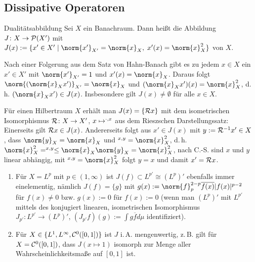 \subsection{%
    Dissipative Operatoren%
}

\begin{Def}{Dualitätsabbildung}
    Sei $X$ ein Banachraum.
    Dann heißt die Abbildung $J\colon X \to \P(X')$ mit
    $J(x) := \{x' \in X' \;|\; \norm{x'}_{X'} = \norm{x}_X,\; x'(x) = \norm{x}_X^2\}$
     von $X$.
\end{Def}

\linie

\begin{Bem}
    Nach einer Folgerung aus dem Satz von Hahn-Banach gibt es zu jedem $x \in X$
    ein $x' \in X'$ mit $\norm{x'}_{X'} = 1$ und
    $x'(x) = \norm{x}_X$.
    Daraus folgt $\norm{(\norm{x}_X x')}_{X'} = \norm{x}_X$ und
    $(\norm{x}_X x')(x) = \norm{x}_X^2$, d.\,h. $(\norm{x}_X x') \in J(x)$.
    Insbesondere gilt $J(x) \not= \emptyset$ für alle $x \in X$.
\end{Bem}

\begin{Bem}
    Für einen Hilbertraum $X$ erhält man $J(x) = \{\R x\}$ mit dem isometrischen Isomorphismus
    $\R\colon X \to X'$, $x \mapsto \sp{\cdot, x}$ aus dem Rieszschen Darstellungssatz:
    Einerseits gilt $\R x \in J(x)$.
    Andererseits folgt aus $x' \in J(x)$ mit $y := \R^{-1} x' \in X$,
    dass $\norm{y}_X = \norm{x}_X$ und $\sp{x, y} = \norm{x}_X^2$,
    d.\,h. $\norm{x}_X^2 = \sp{x, y} \le \norm{x}_X \norm{y}_X = \norm{x}_X^2$,
    nach C.-S. sind $x$ und $y$ linear abhängig, mit $\sp{x, y} = \norm{x}_X^2$ folgt $y = x$
    und damit $x' = \R x$.
\end{Bem}

\begin{Bsp}
    \begin{enumerate}
        \item
        Für $X = L^p$ mit $p \in (1, \infty)$ ist $J(f) \subset L^{p'} \cong (L^p)'$ ebenfalls immer
        einelementig, nämlich $J(f) = \{g\}$ mit
        $g(x) := \norm{f}_p^{2-p} \overline{f(x)} |f(x)|^{p-2}$ für $f(x) \not= 0$
        bzw. $g(x) := 0$ für $f(x) := 0$
        (wenn man $(L^p)'$ mit $L^{p'}$ mittels des konjugiert linearen, isometrischen Isomorphismus
        $J_{p'}\colon L^{p'} \to (L^p)'$, $(J_{p'} f)(g) := \int g \overline{f} d\mu$
        identifiziert).

        \item
        Für $X \in \{L^1, L^\infty, \C^0([0, 1])\}$ ist $J$ i.\,A. mengenwertig,
        z.\,B. gilt für $X = \C^0([0, 1])$, dass $J(x \mapsto 1)$
        isomorph zur Menge aller Wahrscheinlichkeitsmaße auf $[0, 1]$ ist.
    \end{enumerate}
\end{Bsp}

